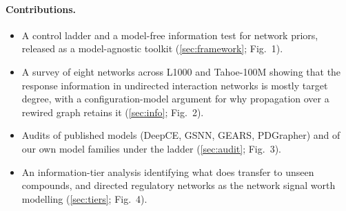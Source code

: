 \paragraph{Contributions.}
\begin{itemize}
  \item A control ladder and a model-free information test for network priors, released as a
        model-agnostic toolkit (\cref{sec:framework}; Fig.~1).
  \item A survey of eight networks across L1000 and Tahoe-100M showing that the response information in
        undirected interaction networks is mostly target degree, with a configuration-model argument for
        why propagation over a rewired graph retains it (\cref{sec:info}; Fig.~2).
  \item Audits of published models (DeepCE, GSNN, GEARS, PDGrapher) and of our own model families under
        the ladder (\cref{sec:audit}; Fig.~3).
  \item An information-tier analysis identifying what does transfer to unseen compounds, and directed
        regulatory networks as the network signal worth modelling (\cref{sec:tiers}; Fig.~4).
\end{itemize}
